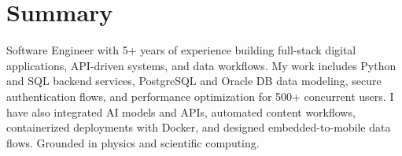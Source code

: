 \section{Summary}

Software Engineer with 5+ years of experience building full-stack digital applications, API-driven systems, and data workflows. My work includes Python and SQL backend services, PostgreSQL and Oracle DB data modeling, secure authentication flows, and performance optimization for 500+ concurrent users. I have also integrated AI models and APIs, automated content workflows, containerized deployments with Docker, and designed embedded-to-mobile data flows. Grounded in physics and scientific computing.
